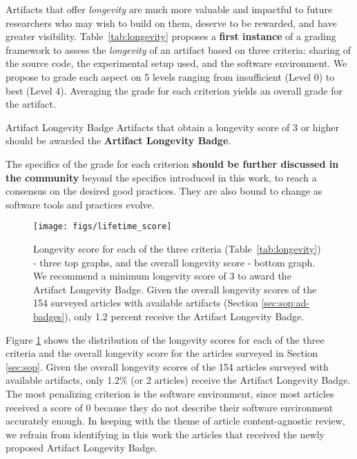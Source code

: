 \documentclass[sigconf,natbib=false]{acmart}
\begin{document}
Artifacts that offer \emph{longevity} are much more valuable and impactful to future researchers who may wish to build on them, deserve to be rewarded, and have greater visibility.
Table\ \ref{tab:longevity} proposes a \textbf{first instance} of a grading framework to assess the \emph{longevity} of an artifact based on three criteria: sharing of the source code, the experimental setup used, and the software environment.
We propose to grade each aspect on 5 levels ranging from insufficient (Level 0) to best (Level 4).
Averaging the grade for each criterion yields an overall grade for the artifact.
\begin{recommendation*}{Artifact Longevity Badge}{}
  Artifacts that obtain a longevity score of 3 or higher should be awarded the \textbf{Artifact Longevity Badge}. 
\end{recommendation*}
The specifics of the grade for each criterion \textbf{should be further discussed in the community} beyond the specifics introduced in this work, to reach a consensus on the desired good practices.
They are also bound to change as software tools and practices evolve.


\begin{figure}
  \centering
    \texttt{[image: figs/lifetime\_score]}
  \caption{Longevity score for each of the three criteria (Table~\ref{tab:longevity}) - three top graphs, and the overall longevity score - bottom graph.
  We recommend a minimum longevity score of 3 to award the Artifact Longevity Badge.
  Given the overall longevity scores of the 154 surveyed articles with available artifacts (Section \ref{sec:sop:ad-badges}), only 1.2 percent receive the Artifact Longevity Badge.}\label{fig:longevity_score}
\end{figure}

Figure \ref{fig:longevity_score} shows the distribution of the longevity scores for each of the three criteria and the overall longevity score for the articles surveyed in Section \ref{sec:sop}.
Given the overall longevity scores of the 154 articles surveyed with available artifacts, only 1.2\% (or 2 articles) receive the Artifact Longevity Badge.
The most penalizing criterion is the software environment, since most articles received a score of 0 because they do not describe their software environment accurately enough. %
In keeping with the theme of article content-agnostic review, we refrain from identifying in this work the articles that received the newly proposed Artifact Longevity Badge. 
\end{document}

